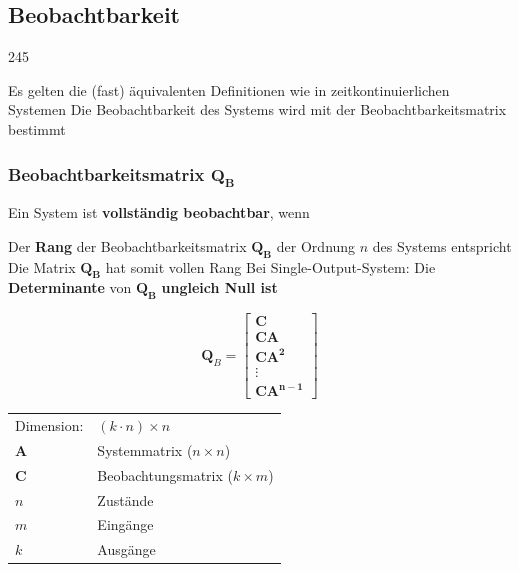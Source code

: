 \subsection{Beobachtbarkeit}{245}

\begin{outline}
    \1 Es gelten die (fast) äquivalenten Definitionen wie in zeitkontinuierlichen Systemen
    \1 Die Beobachtbarkeit des Systems wird mit der Beobachtbarkeitsmatrix bestimmt
\end{outline}


\subsubsection{Beobachtbarkeitsmatrix $\bm{Q_B}$}

Ein System ist \textbf{vollständig beobachtbar}, wenn

\begin{outline}
    \1 Der \textbf{Rang} der Beobachtbarkeitsmatrix $\bm{Q_B}$ der Ordnung $n$ des Systems entspricht
        \2 Die Matrix $\bm{Q_B}$ hat somit vollen Rang
    \1 Bei Single-Output-System:  Die \textbf{Determinante} von $\bm{Q_B}$ \textbf{ungleich Null ist}
\end{outline}

\smallskip

\begin{minipage}[c]{0.4\columnwidth}
    $$
    \bm{Q}_B = 
    \begin{bmatrix}
        \bm{C} \\ \bm{C A} \\ \bm{C A^2} \\ \vdots \\ \bm{C A^{n-1}} 
    \end{bmatrix}
    $$
\end{minipage}
\hfill
\begin{minipage}[c]{0.58\columnwidth}
    \begin{tabular}{ll}
        Dimension:  & $(k \cdot n) \times n$ \\
        $\bm{A}$    & Systemmatrix ($n \times n$) \\
        $\bm{C}$    & Beobachtungsmatrix ($k \times m$) \\
        $n$         & Zustände \\
        $m$         & Eingänge \\
        $k$         & Ausgänge 
    \end{tabular}
\end{minipage}


\columnbreak

